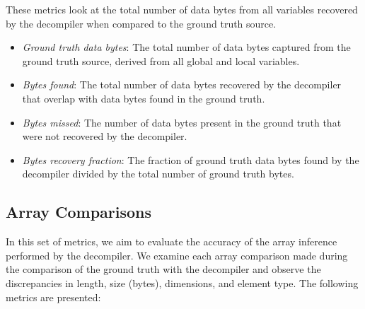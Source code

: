 These metrics look at the total number of data bytes from all variables recovered by the decompiler when compared to the ground truth source.

\begin{itemize}
    \item \emph{Ground truth data bytes}: The total number of data bytes captured from the ground truth source, derived from all global and local variables.
    \item \emph{Bytes found}: The total number of data bytes recovered by the decompiler that overlap with data bytes found in the ground truth.
    \item \emph{Bytes missed}: The number of data bytes present in the ground truth that were not recovered by the decompiler.
    \item \emph{Bytes recovery fraction}: The fraction of ground truth data bytes found by the decompiler divided by the total number of ground truth bytes.
\end{itemize}

\subsection{Array Comparisons}

In this set of metrics, we aim to evaluate the accuracy of the array inference performed by the decompiler. We examine each array comparison made during the comparison of the ground truth with the decompiler and observe the discrepancies in length, size (bytes), dimensions, and element type. The following metrics are presented:

